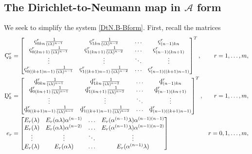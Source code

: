 \documentclass[10pt,reqno,oneside,a4paper]{article}
\begin{document}
\subsection{The Dirichlet-to-Neumann map in $\mathcal{A}$ form}
We seek to simplify the system \eqref{DtN.B-Bform}. First, recall the matrices
\begin{align*}
\textup{\c{C}}^r_k &= 
\begin{bmatrix} 
\textup{\c{c}}_{0 kn}^r  \frac{1}{(i \lambda)^{n-1}} & \textup{\c{c}}_{1 kn}^r  \frac{1}{(i \lambda)^{n-2}} & \ldots & \textup{\c{c}}_{(n-1) kn}^r   \\
\textup{\c{c}}_{0 (kn+1)}^r  \frac{1}{(i \lambda)^{n-1}} & \textup{\c{c}}_{1 (kn+1)}^r  \frac{1}{(i \lambda)^{n-2}} & \ldots & \textup{\c{c}}_{(n-1) (kn+1)}^r   \\
\vdots & \vdots & \ddots & \vdots \\
\textup{\c{c}}_{0 ((k+1)n-1)}^r  \frac{1}{(i \lambda)^{n-1}} & \textup{\c{c}}_{1 ((k+1)n-1)}^r  \frac{1}{(i \lambda)^{n-2}} & \ldots & \textup{\c{c}}_{(n-1) ((k+1)n-1)}^r 
\end{bmatrix}^T, & r =  1, \ldots, m, \\
\textup{\c{D}}^r_k &=
\begin{bmatrix} 
\textup{\c{d}}_{0 kn}^r  \frac{1}{(i \lambda)^{n-1}} & \textup{\c{d}}_{1 kn}^r  \frac{1}{(i \lambda)^{n-2}} & \ldots & \textup{\c{d}}_{(n-1) kn}^r   \\
\textup{\c{d}}_{0 (kn+1)}^r  \frac{1}{(i \lambda)^{n-1}} & \textup{\c{d}}_{1 (kn+1)}^r  \frac{1}{(i \lambda)^{n-2}} & \ldots & \textup{\c{d}}_{(n-1) (kn+1)}^r   \\
\vdots & \vdots & \ddots & \vdots \\
\textup{\c{d}}_{0 ((k+1)n-1)}^r  \frac{1}{(i \lambda)^{n-1}} & \textup{\c{d}}_{1 ((k+1)n-1)}^r  \frac{1}{(i \lambda)^{n-2}} & \ldots & \textup{\c{d}}_{(n-1) ((k+1)n-1)}^r 
\end{bmatrix}^T, & r =  1, \ldots, m, \\
e_r &= \begin{bmatrix} 
E_r(\lambda) & E_r(\alpha \lambda)\alpha^{(n-1)} & \ldots & E_r(\alpha^{(n-1)} \lambda) \alpha^{(n-1)(n-1)} \\
E_r(\lambda) & E_r(\alpha \lambda)\alpha^{(n-2)} & \ldots & E_r(\alpha^{(n-1)} \lambda) \alpha^{(n-1)(n-2)} \\
\vdots & \vdots & \ddots & \vdots \\
E_r(\lambda) & E_r(\alpha \lambda) & \ldots & E_r(\alpha^{(n-1)} \lambda) \\
\end{bmatrix}
& r = 0, 1, \ldots, m,
\end{align*}
\end{document}
